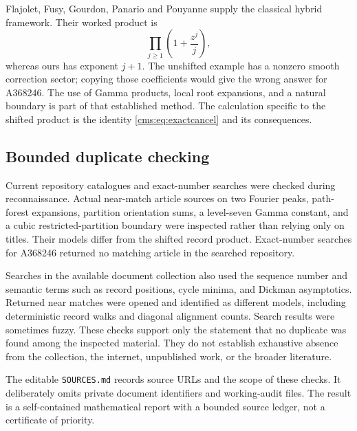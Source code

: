 Flajolet, Fusy, Gourdon, Panario and Pouyanne \cite[Theorems~1--2, Section~3]{FFGPP} supply the classical hybrid framework. Their worked product is
\[
\prod_{j\geq1}\left(1+\frac{z^j}{j}\right),
\]
whereas ours has exponent $j+1$. The unshifted example has a nonzero smooth correction sector; copying those coefficients would give the wrong answer for A368246. The use of Gamma products, local root expansions, and a natural boundary is part of that established method. The calculation specific to the shifted product is the identity \eqref{cms:eq:exactcancel} and its consequences.

\subsection{Bounded duplicate checking}
Current repository catalogues and exact-number searches were checked during reconnaissance. Actual near-match article sources on two Fourier peaks, path-forest expansions, partition orientation sums, a level-seven Gamma constant, and a cubic restricted-partition boundary were inspected rather than relying only on titles. Their models differ from the shifted record product. Exact-number searches for A368246 returned no matching article in the searched repository.

Searches in the available document collection also used the sequence number and semantic terms such as record positions, cycle minima, and Dickman asymptotics. Returned near matches were opened and identified as different models, including deterministic record walks and diagonal alignment counts. Search results were sometimes fuzzy. These checks support only the statement that no duplicate was found among the inspected material. They do not establish exhaustive absence from the collection, the internet, unpublished work, or the broader literature.

The editable \texttt{SOURCES.md} records source URLs and the scope of these checks. It deliberately omits private document identifiers and working-audit files. The result is a self-contained mathematical report with a bounded source ledger, not a certificate of priority.

